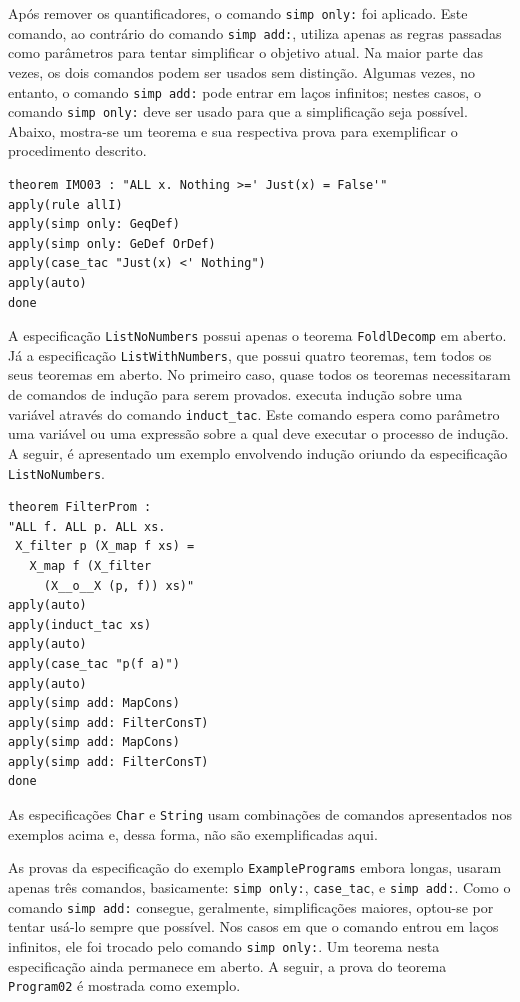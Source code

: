Após remover os quantificadores, o comando \Verb.simp only:. foi aplicado.
Este comando, ao contrário do comando \Verb.simp add:., utiliza apenas as regras passadas como parâmetros para tentar simplificar o objetivo atual.
Na maior parte das vezes, os dois comandos podem ser usados sem distinção.
Algumas vezes, no entanto, o comando \Verb.simp add:. pode entrar em laços infinitos; nestes casos, o comando \Verb.simp only:. deve ser usado para que a simplificação seja possível.
Abaixo, mostra-se um teorema e sua respectiva prova para exemplificar o procedimento descrito.

\begin{Verbatim}
theorem IMO03 : "ALL x. Nothing >=' Just(x) = False'"
apply(rule allI)
apply(simp only: GeqDef)
apply(simp only: GeDef OrDef)
apply(case_tac "Just(x) <' Nothing")
apply(auto)
done
\end{Verbatim}

A especificação \Verb.ListNoNumbers. possui apenas o teorema \Verb.FoldlDecomp. em aberto.
Já a especificação \Verb.ListWithNumbers., que possui quatro teoremas, tem todos os seus teoremas em aberto.
No primeiro caso, quase todos os teoremas necessitaram de comandos de indução para serem provados.
\Isabelle executa indução sobre uma variável através do comando \Verb.induct_tac..
Este comando espera como parâmetro uma variável ou uma expressão sobre a qual deve executar o processo de indução.
A seguir, é apresentado um exemplo envolvendo indução oriundo da especificação \Verb.ListNoNumbers..

\begin{Verbatim}
theorem FilterProm :
"ALL f. ALL p. ALL xs.
 X_filter p (X_map f xs) = 
   X_map f (X_filter 
     (X__o__X (p, f)) xs)"
apply(auto)
apply(induct_tac xs)
apply(auto)
apply(case_tac "p(f a)")
apply(auto)
apply(simp add: MapCons)
apply(simp add: FilterConsT)
apply(simp add: MapCons)
apply(simp add: FilterConsT)
done
\end{Verbatim}

As especificações \Verb.Char. e \Verb.String. usam combinações de comandos apresentados nos exemplos acima e, dessa forma, não são exemplificadas aqui.

As provas da especificação do exemplo \Verb.ExamplePrograms. embora longas, usaram apenas três comandos, basicamente: \Verb.simp only:., \Verb.case_tac., e \Verb.simp add:..
Como o comando \Verb.simp add:. consegue, geralmente, simplificações maiores, optou-se por tentar usá-lo sempre que possível.
Nos casos em que o comando entrou em laços infinitos, ele foi trocado pelo comando \Verb.simp only:..
Um teorema nesta especificação ainda permanece em aberto.
A seguir, a prova do teorema \Verb.Program02. é mostrada como exemplo.

